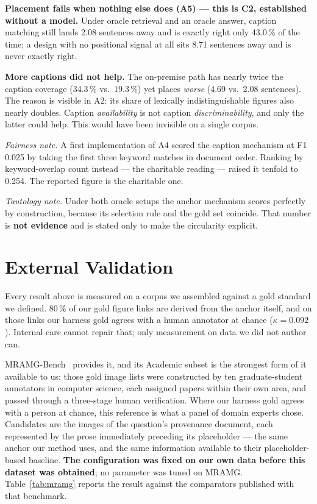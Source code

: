 \documentclass[journal]{IEEEtran}
\begin{document}
\textbf{Placement fails when nothing else does (A5) --- this is C2, established
without a model.} Under oracle retrieval and an oracle answer, caption matching
still lands 2.08 sentences away and is exactly right only 43.0\,\% of the time; a
design with no positional signal at all sits 8.71 sentences away and is never
exactly right.

\textbf{More captions did not help.} The on-premise path has nearly twice the
caption coverage (34.3\,\% vs.\ 19.3\,\%) yet places \emph{worse} (4.69 vs.\ 2.08
sentences). The reason is visible in A2: its share of lexically indistinguishable
figures also nearly doubles. Caption \emph{availability} is not caption
\emph{discriminability}, and only the latter could help. This would have been
invisible on a single corpus.

\emph{Fairness note.} A first implementation of A4 scored the caption mechanism at
F1 0.025 by taking the first three keyword matches in document order. Ranking by
keyword-overlap count instead --- the charitable reading --- raised it tenfold to
0.254. The reported figure is the charitable one.

\emph{Tautology note.} Under both oracle setups the anchor mechanism scores
perfectly by construction, because its selection rule and the gold set coincide.
That number is \textbf{not evidence} and is stated only to make the circularity
explicit.

\section{External Validation}
\label{sec:external}

Every result above is measured on a corpus we assembled against a gold standard we
defined. 80\,\% of our gold figure links are derived from the anchor itself, and on
those links our harness gold agrees with a human annotator at chance
($\kappa = 0.092$). Internal care cannot repair that; only measurement on data we
did not author can.

MRAMG-Bench~\cite{mramg} provides it, and its Academic subset is the strongest
form of it available to us: those gold image lists were constructed by ten
graduate-student annotators in computer science, each assigned papers within
their own area, and passed through a three-stage human verification. Where our
harness gold agrees with a person at chance, this reference is what a panel of
domain experts chose. Candidates are the images of the question's
provenance document, each represented by the prose immediately preceding its
placeholder --- the same anchor our method uses, and the same information
available to their placeholder-based baseline. \textbf{The configuration was fixed
on our own data before this dataset was obtained}; no parameter was tuned on
MRAMG. Table~\ref{tab:mramg} reports the result against the comparators published
with that benchmark.
\end{document}
